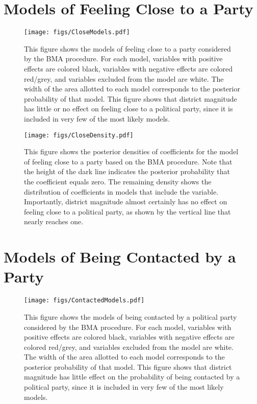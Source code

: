 \documentclass[12pt]{article}
\begin{document}
\clearpage

\section{Models of Feeling Close to a Party}

\begin{figure}[h]
\centering
\texttt{[image: figs/CloseModels.pdf]}
\caption{This figure shows the models of feeling close to a party considered by the BMA procedure. For each model, variables with positive effects are colored black, variables with negative effects are colored red/grey, and variables excluded from the model are white. The width of the area allotted to each model corresponds to the posterior probability of that model. This figure shows that district magnitude has little or no effect on feeling close to a political party, since it is included in very few of the most likely models.}\label{fig:CloseModels}
\end{figure}

\begin{figure}[h]
\centering
\texttt{[image: figs/CloseDensity.pdf]}
\caption{This figure shows the posterior densities of coefficients for the model of feeling close to a party based on the BMA procedure. Note that the height of the dark line indicates the posterior probability that the coefficient equals zero. The remaining density shows the distribution of coefficients in models that include the variable. Importantly, district magnitude almost certainly has no effect on feeling close to a political party, as shown by the vertical line that nearly reaches one.}\label{fig:CloseDensity}
\end{figure}

\clearpage

\section{Models of Being Contacted by a Party}

\begin{figure}[h]
\centering
\texttt{[image: figs/ContactedModels.pdf]}
\caption{This figure shows the models of being contacted by a political party considered by the BMA procedure. For each model, variables with positive effects are colored black, variables with negative effects are colored red/grey, and variables excluded from the model are white. The width of the area allotted to each model corresponds to the posterior probability of that model. This figure shows that district magnitude has little effect on the probability of being contacted by a political party, since it is included in very few of the most likely models.}\label{fig:ContactedModels}
\end{figure}
\end{document}
